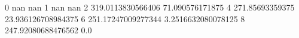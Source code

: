 0 nan nan
1 nan nan
2 319.0113830566406 71.090576171875
4 271.85693359375 23.936126708984375
6 251.17247009277344 3.2516632080078125
8 247.92080688476562 0.0
